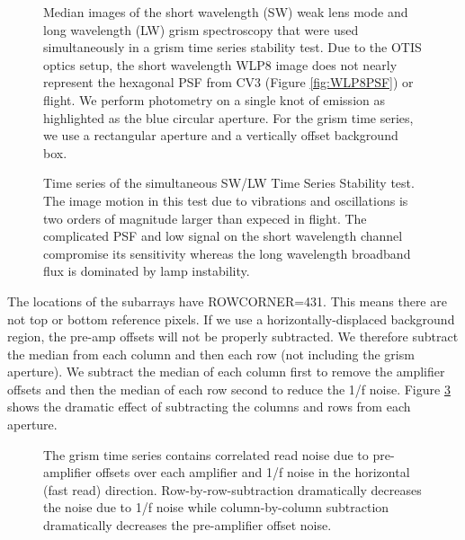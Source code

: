 \documentclass{aastex62}
\begin{document}
\begin{figure}
\caption{Median images of the short wavelength (SW) weak lens mode and long wavelength (LW) grism spectroscopy that were used simultaneously in a grism time series stability test.
Due to the OTIS optics setup, the short wavelength WLP8 image does not nearly represent the hexagonal PSF from CV3 (Figure \ref{fig:WLP8PSF}) or flight.
We perform photometry on a single knot of emission as highlighted as the blue circular aperture.
For the grism time series, we use a rectangular aperture and a vertically offset background box.
}\label{fig:otisPSFs}
\end{figure}

\begin{figure}
\caption{Time series of the simultaneous SW/LW Time Series Stability test.
The image motion in this test due to vibrations and oscillations is two orders of magnitude larger than expeced in flight.
The complicated PSF and low signal on the short wavelength channel compromise its sensitivity whereas the long wavelength broadband flux is dominated by lamp instability.
}\label{fig:otisLWSWtser}
\end{figure}


The locations of the subarrays have ROWCORNER=431.
This means there are not top or bottom reference pixels.
If we use a horizontally-displaced background region, the pre-amp offsets will not be properly subtracted.
We therefore subtract the median from each column and then each row (not including the grism aperture).
We subtract the median of each column first to remove the amplifier offsets and then the median of each row second to reduce the 1/f noise.
Figure \ref{fig:otisLWcolrowSub} shows the dramatic effect of subtracting the columns and rows from each aperture.

\begin{figure}
\caption{The grism time series contains correlated read noise due to pre-amplifier offsets over each amplifier and 1/f noise in the horizontal (fast read) direction.
Row-by-row-subtraction dramatically decreases the noise due to 1/f noise while column-by-column subtraction dramatically decreases the pre-amplifier offset noise.
}\label{fig:otisLWcolrowSub}
\end{figure}
\end{document}
